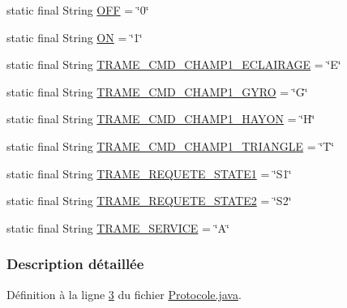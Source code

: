 \begin{DoxyCompactItemize}
\item 
static final String \hyperlink{classcom_1_1lasalle_1_1io__trucks_1_1_protocole_a337c33c7beefdd450deaae70a9ec9f54}{O\+FF} = \char`\"{}0\char`\"{}
\item 
static final String \hyperlink{classcom_1_1lasalle_1_1io__trucks_1_1_protocole_abe095f5652f01c6e6ebdbca02096067a}{ON} = \char`\"{}1\char`\"{}
\item 
static final String \hyperlink{classcom_1_1lasalle_1_1io__trucks_1_1_protocole_a631098f51eceefdbc21f7421da895101}{T\+R\+A\+M\+E\+\_\+\+C\+M\+D\+\_\+\+C\+H\+A\+M\+P1\+\_\+\+E\+C\+L\+A\+I\+R\+A\+GE} = \char`\"{}E\char`\"{}
\item 
static final String \hyperlink{classcom_1_1lasalle_1_1io__trucks_1_1_protocole_afb59382b7fa553318204ec2a532642b7}{T\+R\+A\+M\+E\+\_\+\+C\+M\+D\+\_\+\+C\+H\+A\+M\+P1\+\_\+\+G\+Y\+RO} = \char`\"{}G\char`\"{}
\item 
static final String \hyperlink{classcom_1_1lasalle_1_1io__trucks_1_1_protocole_a798ef2556e16895125e2924b69307e8a}{T\+R\+A\+M\+E\+\_\+\+C\+M\+D\+\_\+\+C\+H\+A\+M\+P1\+\_\+\+H\+A\+Y\+ON} = \char`\"{}H\char`\"{}
\item 
static final String \hyperlink{classcom_1_1lasalle_1_1io__trucks_1_1_protocole_a72a6435b14684aaf0a646e7126c275cd}{T\+R\+A\+M\+E\+\_\+\+C\+M\+D\+\_\+\+C\+H\+A\+M\+P1\+\_\+\+T\+R\+I\+A\+N\+G\+LE} = \char`\"{}T\char`\"{}
\item 
static final String \hyperlink{classcom_1_1lasalle_1_1io__trucks_1_1_protocole_a84b2f823d7e9cf9b1e7ab1cc4de3ea65}{T\+R\+A\+M\+E\+\_\+\+R\+E\+Q\+U\+E\+T\+E\+\_\+\+S\+T\+A\+T\+E1} = \char`\"{}S1\char`\"{}
\item 
static final String \hyperlink{classcom_1_1lasalle_1_1io__trucks_1_1_protocole_a42de7920a4e43955c1e3ada68a377602}{T\+R\+A\+M\+E\+\_\+\+R\+E\+Q\+U\+E\+T\+E\+\_\+\+S\+T\+A\+T\+E2} = \char`\"{}S2\char`\"{}
\item 
static final String \hyperlink{classcom_1_1lasalle_1_1io__trucks_1_1_protocole_ac4130b9f4833c6fea2cbdd5af69cae94}{T\+R\+A\+M\+E\+\_\+\+S\+E\+R\+V\+I\+CE} = \char`\"{}A\char`\"{}
\end{DoxyCompactItemize}


\subsubsection{Description détaillée}


Définition à la ligne \hyperlink{_protocole_8java_source_l00003}{3} du fichier \hyperlink{_protocole_8java_source}{Protocole.\+java}.



